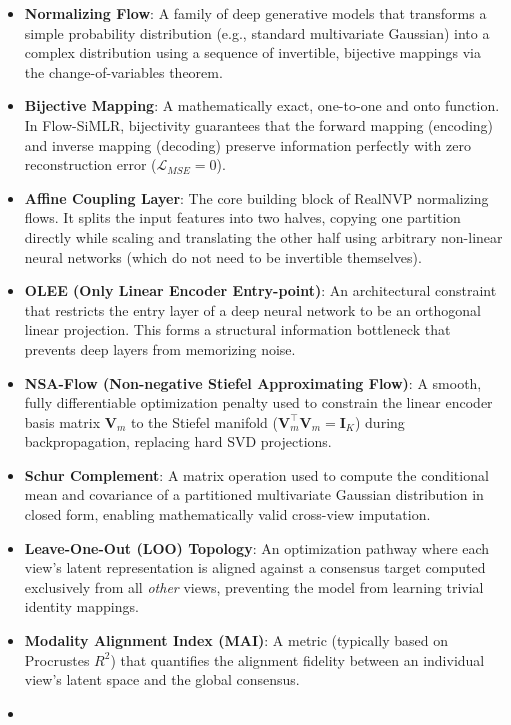 \documentclass[
  letterpaper,
]{report}
\providecommand{\tightlist}{%
  \setlength{\itemsep}{0pt}\setlength{\parskip}{0pt}}
\begin{document}
\begin{itemize}
\tightlist
\item
  \textbf{Normalizing Flow}: A family of deep generative models that
  transforms a simple probability distribution (e.g., standard
  multivariate Gaussian) into a complex distribution using a sequence of
  invertible, bijective mappings via the change-of-variables theorem.
\item
  \textbf{Bijective Mapping}: A mathematically exact, one-to-one and
  onto function. In Flow-SiMLR, bijectivity guarantees that the forward
  mapping (encoding) and inverse mapping (decoding) preserve information
  perfectly with zero reconstruction error (\(\mathcal{L}_{MSE} = 0\)).
\item
  \textbf{Affine Coupling Layer}: The core building block of RealNVP
  normalizing flows. It splits the input features into two halves,
  copying one partition directly while scaling and translating the other
  half using arbitrary non-linear neural networks (which do not need to
  be invertible themselves).
\item
  \textbf{OLEE (Only Linear Encoder Entry-point)}: An architectural
  constraint that restricts the entry layer of a deep neural network to
  be an orthogonal linear projection. This forms a structural
  information bottleneck that prevents deep layers from memorizing
  noise.
\item
  \textbf{NSA-Flow (Non-negative Stiefel Approximating Flow)}: A smooth,
  fully differentiable optimization penalty used to constrain the linear
  encoder basis matrix \(\mathbf{V}_m\) to the Stiefel manifold
  (\(\mathbf{V}_m^\top \mathbf{V}_m = \mathbf{I}_K\)) during
  backpropagation, replacing hard SVD projections.
\item
  \textbf{Schur Complement}: A matrix operation used to compute the
  conditional mean and covariance of a partitioned multivariate Gaussian
  distribution in closed form, enabling mathematically valid cross-view
  imputation.
\item
  \textbf{Leave-One-Out (LOO) Topology}: An optimization pathway where
  each view's latent representation is aligned against a consensus
  target computed exclusively from all \emph{other} views, preventing
  the model from learning trivial identity mappings.
\item
  \textbf{Modality Alignment Index (MAI)}: A metric (typically based on
  Procrustes \(R^2\)) that quantifies the alignment fidelity between an
  individual view's latent space and the global consensus.
\item

\end{itemize}
\end{document}
